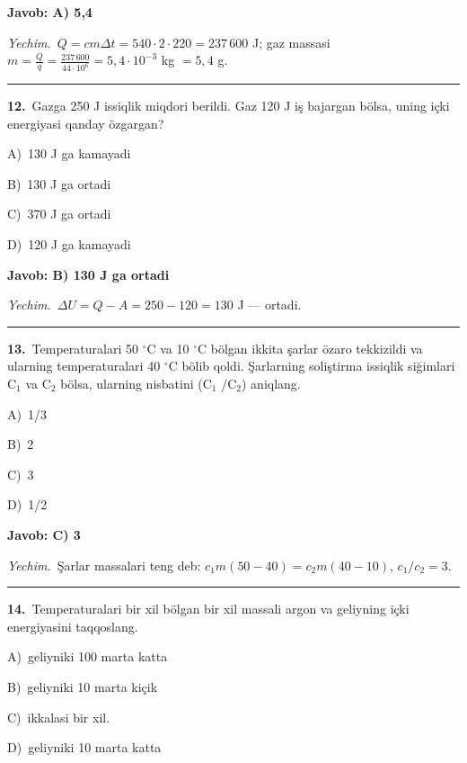 \documentclass[11pt,a4paper]{article}
\newcommand{\opt}[2]{\hspace*{4mm}#1)\ #2\par}
\begin{document}
\noindent\colorbox{gray!12}{\parbox{\dimexpr\linewidth-2\fboxsep}{\textbf{Javob: A) 5,4}}}\par\smallskip
\noindent\textit{Yechim.}\ $Q=cm\Delta t=540\cdot2\cdot220=237\,600$ J; gaz massasi $m=\frac{Q}{q}=\frac{237\,600}{44\cdot10^6}=5{,}4\cdot10^{-3}$ kg $=5{,}4$ g.\par\par\medskip\hrule\medskip
{}\noindent\begin{minipage}{\linewidth}
\textbf{12.}\ Gazga 250 J issiqlik miqdori berildi. Gaz 120 J iş bajargan bölsa, uning içki energiyasi qanday özgargan?\par\smallskip
\opt{A}{130 J ga kamayadi}
\opt{B}{130 J ga ortadi}
\opt{C}{370 J ga ortadi}
\opt{D}{120 J ga kamayadi}
\end{minipage}\vspace{2pt}\par
\noindent\colorbox{gray!12}{\parbox{\dimexpr\linewidth-2\fboxsep}{\textbf{Javob: B) 130 J ga ortadi}}}\par\smallskip
\noindent\textit{Yechim.}\ $\Delta U=Q-A=250-120=130$ J — ortadi.\par\par\medskip\hrule\medskip
{}\noindent\begin{minipage}{\linewidth}
\textbf{13.}\ Temperaturalari 50 $^\circ$C va 10 $^\circ$C bölgan ikkita şarlar özaro tekkizildi va ularning temperaturalari 40 $^\circ$C bölib qoldi. Şarlarning soliştirma issiqlik siğimlari C$_{1}$ va C$_{2}$ bölsa, ularning nisbatini (C$_{1}$ /C$_{2}$) aniqlang.\par\smallskip
\opt{A}{1/3}
\opt{B}{2}
\opt{C}{3}
\opt{D}{1/2}
\end{minipage}\vspace{2pt}\par
\noindent\colorbox{gray!12}{\parbox{\dimexpr\linewidth-2\fboxsep}{\textbf{Javob: C) 3}}}\par\smallskip
\noindent\textit{Yechim.}\ Şarlar massalari teng deb: $c_1m(50-40)=c_2m(40-10)$, $c_1/c_2=3$.\par\par\medskip\hrule\medskip
{}\noindent\begin{minipage}{\linewidth}
\textbf{14.}\ Temperaturalari bir xil bölgan bir xil massali argon va geliyning içki energiyasini taqqoslang.\par\smallskip
\opt{A}{geliyniki 100 marta katta}
\opt{B}{geliyniki 10 marta kiçik}
\opt{C}{ikkalasi bir xil.}
\opt{D}{geliyniki 10 marta katta}
\end{minipage}\vspace{2pt}\par
\end{document}
